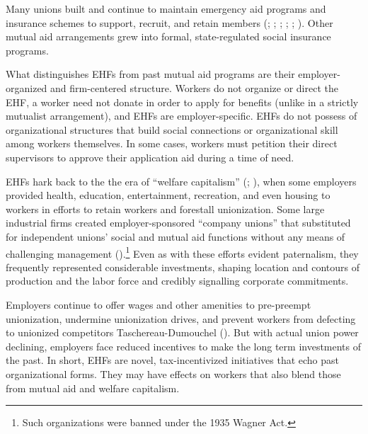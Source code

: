 \documentclass[
  11pt,
  oneside]{article}
\begin{document}
Many unions built and continue to maintain emergency aid programs and insurance schemes to support, recruit, and retain members (; ; ; ; ; ). Other mutual aid arrangements grew into formal, state-regulated social insurance programs.

What distinguishes EHFs from past mutual aid programs are their employer-organized and firm-centered structure. Workers do not organize or direct the EHF, a worker need not donate in order to apply for benefits (unlike in a strictly mutualist arrangement), and EHFs are employer-specific. EHFs do not possess of organizational structures that build social connections or organizational skill among workers themselves. In some cases, workers must petition their direct supervisors to approve their application aid during a time of need.

EHFs hark back to the the era of ``welfare capitalism'' (; ), when some employers provided health, education, entertainment, recreation, and even housing to workers in efforts to retain workers and forestall unionization. Some large industrial firms created employer-sponsored ``company unions'' that substituted for independent unions' social and mutual aid functions without any means of challenging management ().\footnote{Such organizations were banned under the 1935 Wagner Act.} Even as with these efforts evident paternalism, they frequently represented considerable investments, shaping location and contours of production and the labor force and credibly signalling corporate commitments.

Employers continue to offer wages and other amenities to pre-preempt unionization, undermine unionization drives, and prevent workers from defecting to unionized competitors Taschereau-Dumouchel (). But with actual union power declining, employers face reduced incentives to make the long term investments of the past.
In short, EHFs are novel, tax-incentivized initiatives that echo past organizational forms. They may have effects on workers that also blend those from mutual aid and welfare capitalism.
\end{document}
